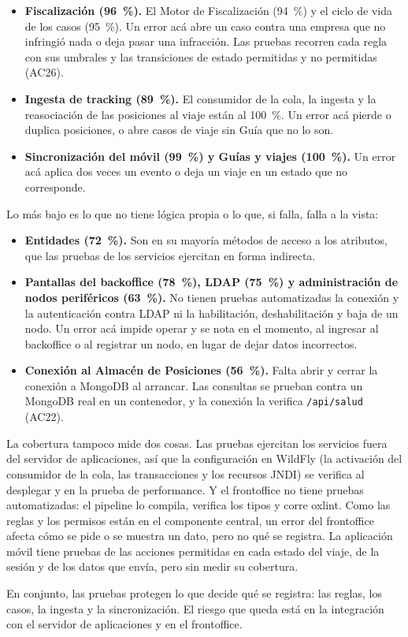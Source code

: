 \begin{itemize}
    \item \textbf{Fiscalización (96~\%).} El Motor de Fiscalización (94~\%) y el ciclo de vida de los casos (95~\%). Un error acá abre un caso contra una empresa que no infringió nada o deja pasar una infracción. Las pruebas recorren cada regla con sus umbrales y las transiciones de estado permitidas y no permitidas (AC26).
    \item \textbf{Ingesta de tracking (89~\%).} El consumidor de la cola, la ingesta y la reasociación de las posiciones al viaje están al 100~\%. Un error acá pierde o duplica posiciones, o abre casos de viaje sin Guía que no lo son.
    \item \textbf{Sincronización del móvil (99~\%) y Guías y viajes (100~\%).} Un error acá aplica dos veces un evento o deja un viaje en un estado que no corresponde.
\end{itemize}

Lo más bajo es lo que no tiene lógica propia o lo que, si falla, falla a la vista:

\begin{itemize}
    \item \textbf{Entidades (72~\%).} Son en su mayoría métodos de acceso a los atributos, que las pruebas de los servicios ejercitan en forma indirecta.
    \item \textbf{Pantallas del backoffice (78~\%), LDAP (75~\%) y administración de nodos periféricos (63~\%).} No tienen pruebas automatizadas la conexión y la autenticación contra LDAP ni la habilitación, deshabilitación y baja de un nodo. Un error acá impide operar y se nota en el momento, al ingresar al backoffice o al registrar un nodo, en lugar de dejar datos incorrectos.
    \item \textbf{Conexión al Almacén de Posiciones (56~\%).} Falta abrir y cerrar la conexión a MongoDB al arrancar. Las consultas se prueban contra un MongoDB real en un contenedor, y la conexión la verifica \texttt{/api/salud} (AC22).
\end{itemize}

La cobertura tampoco mide dos cosas. Las pruebas ejercitan los servicios fuera del servidor de aplicaciones, así que la configuración en WildFly (la activación del consumidor de la cola, las transacciones y los recursos JNDI) se verifica al desplegar y en la prueba de performance. Y el frontoffice no tiene pruebas automatizadas: el pipeline lo compila, verifica los tipos y corre oxlint. Como las reglas y los permisos están en el componente central, un error del frontoffice afecta cómo se pide o se muestra un dato, pero no qué se registra. La aplicación móvil tiene pruebas de las acciones permitidas en cada estado del viaje, de la sesión y de los datos que envía, pero sin medir su cobertura.

En conjunto, las pruebas protegen lo que decide qué se registra: las reglas, los casos, la ingesta y la sincronización. El riesgo que queda está en la integración con el servidor de aplicaciones y en el frontoffice.
